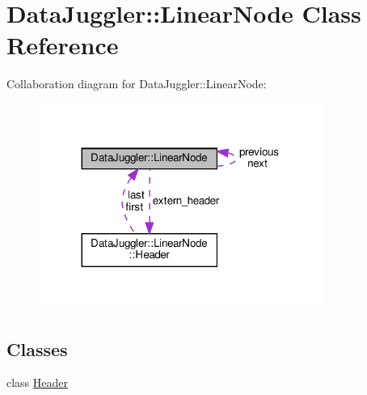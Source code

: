 \hypertarget{classDataJuggler_1_1LinearNode}{}\section{Data\+Juggler\+:\+:Linear\+Node Class Reference}
\label{classDataJuggler_1_1LinearNode}


Collaboration diagram for Data\+Juggler\+:\+:Linear\+Node\+:
\nopagebreak
\begin{figure}[H]
\begin{center}
\leavevmode
\includegraphics[width=263pt]{classDataJuggler_1_1LinearNode__coll__graph}
\end{center}
\end{figure}
\subsection*{Classes}
\begin{DoxyCompactItemize}
\item 
class \hyperlink{classDataJuggler_1_1LinearNode_1_1Header}{Header}
\end{DoxyCompactItemize}
